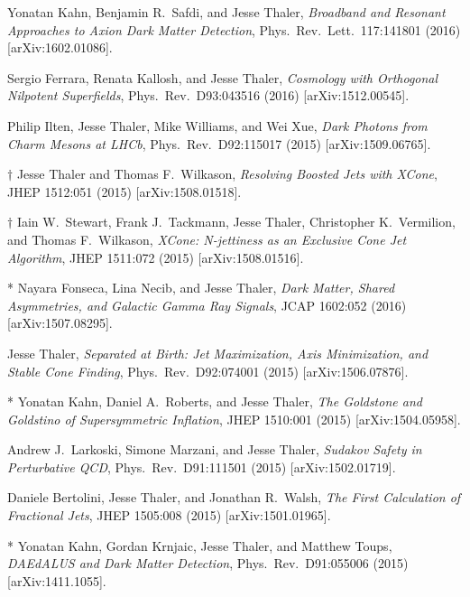 \begin{list}{[]\addtocounter{jessecount}{-1}}{\leftmargin=3em \itemsep=4pt}
\item
 Yonatan Kahn, Benjamin R.\ Safdi, and Jesse Thaler,
\emph{Broadband and Resonant Approaches to Axion Dark Matter Detection},
Phys.\ Rev.\ Lett.\ 117:141801 (2016)
[arXiv:1602.01086].

\item
 Sergio Ferrara, Renata Kallosh, and Jesse Thaler,
\emph{Cosmology with Orthogonal Nilpotent Superfields},
Phys.\ Rev.\ D93:043516 (2016)
[arXiv:1512.00545].

\item
 Philip Ilten, Jesse Thaler, Mike Williams, and Wei Xue,
\emph{Dark Photons from Charm Mesons at LHCb},
Phys.\ Rev.\ D92:115017 (2015)
[arXiv:1509.06765].

\item
$\dagger$ Jesse Thaler and Thomas F.\ Wilkason,
\emph{Resolving Boosted Jets with XCone},
JHEP 1512:051 (2015)
[arXiv:1508.01518].

\item
$\dagger$ Iain W.\ Stewart, Frank J.\ Tackmann, Jesse Thaler, Christopher K.\ Vermilion, and Thomas F.\ Wilkason,
\emph{XCone: N-jettiness as an Exclusive Cone Jet Algorithm},
JHEP 1511:072 (2015)
[arXiv:1508.01516].

\item
* Nayara Fonseca, Lina Necib, and Jesse Thaler,
\emph{Dark Matter, Shared Asymmetries, and Galactic Gamma Ray Signals},
JCAP 1602:052 (2016)
[arXiv:1507.08295].

\item
 Jesse Thaler,
\emph{Separated at Birth: Jet Maximization, Axis Minimization, and Stable Cone Finding},
Phys.\ Rev.\ D92:074001 (2015)
[arXiv:1506.07876].

\item
* Yonatan Kahn, Daniel A.\ Roberts, and Jesse Thaler,
\emph{The Goldstone and Goldstino of Supersymmetric Inflation},
JHEP 1510:001 (2015)
[arXiv:1504.05958].

\item
 Andrew J.\ Larkoski, Simone Marzani, and Jesse Thaler,
\emph{Sudakov Safety in Perturbative QCD},
Phys.\ Rev.\ D91:111501 (2015)
[arXiv:1502.01719].

\item
 Daniele Bertolini, Jesse Thaler, and Jonathan R.\ Walsh,
\emph{The First Calculation of Fractional Jets},
JHEP 1505:008 (2015)
[arXiv:1501.01965].

\item
* Yonatan Kahn, Gordan Krnjaic, Jesse Thaler, and Matthew Toups,
\emph{DAEdALUS and Dark Matter Detection},
Phys.\ Rev.\ D91:055006 (2015)
[arXiv:1411.1055].


\end{list}

